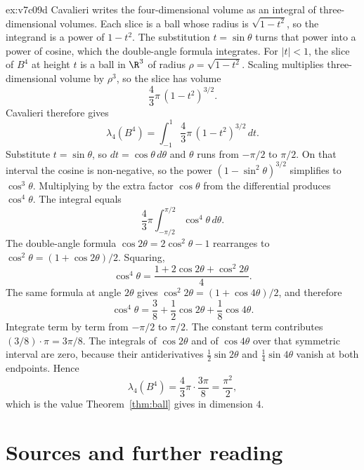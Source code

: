 \begin{solution}{ex:v7c09d}
\idea Cavalieri writes the four-dimensional volume as an integral of three-dimensional volumes. Each slice is a ball whose radius is $\sqrt{1-t^2}$, so the integrand is a power of $1-t^2$. The substitution $t=\sin\theta$ turns that power into a power of cosine, which the double-angle formula integrates.
\writeup For $|t|<1$, the slice of $B^4$ at height $t$ is a ball in $\R^3$ of radius $\rho=\sqrt{1-t^2}$. Scaling multiplies three-dimensional volume by $\rho^3$, so the slice has volume
\[
\frac43\pi\,(1-t^2)^{3/2}.
\]
Cavalieri therefore gives
\[
\lambda_4(B^4)=\int_{-1}^1\frac43\pi\,(1-t^2)^{3/2}\,dt.
\]
Substitute $t=\sin\theta$, so $dt=\cos\theta\,d\theta$ and $\theta$ runs from $-\pi/2$ to $\pi/2$. On that interval the cosine is non-negative, so the power $(1-\sin^2\theta)^{3/2}$ simplifies to $\cos^3\theta$. Multiplying by the extra factor $\cos\theta$ from the differential produces $\cos^4\theta$. The integral equals
\[
\frac43\pi\int_{-\pi/2}^{\pi/2}\cos^4\theta\,d\theta.
\]
The double-angle formula $\cos 2\theta=2\cos^2\theta-1$ rearranges to $\cos^2\theta=(1+\cos 2\theta)/2$. Squaring,
\[
\cos^4\theta=\frac{1+2\cos 2\theta+\cos^2 2\theta}4.
\]
The same formula at angle $2\theta$ gives $\cos^2 2\theta=(1+\cos 4\theta)/2$, and therefore
\[
\cos^4\theta=\frac38+\frac12\cos 2\theta+\frac18\cos 4\theta.
\]
Integrate term by term from $-\pi/2$ to $\pi/2$. The constant term contributes $(3/8)\cdot\pi=3\pi/8$. The integrals of $\cos 2\theta$ and of $\cos 4\theta$ over that symmetric interval are zero, because their antiderivatives $\frac12\sin 2\theta$ and $\frac14\sin 4\theta$ vanish at both endpoints. Hence
\[
\lambda_4(B^4)=\frac43\pi\cdot\frac{3\pi}8=\frac{\pi^2}2,
\]
which is the value Theorem~\ref{thm:ball} gives in dimension $4$.
\end{solution}

\section*{Sources and further reading}

